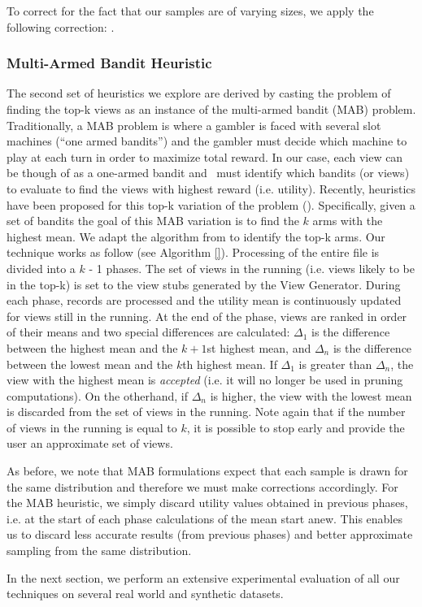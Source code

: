 To correct for the fact that our samples are of varying sizes, we apply the
following correction: .

\subsubsection{Multi-Armed Bandit Heuristic}
\label{subsubsec:multi_armed_bandit}
The second set of heuristics we explore are derived by casting the problem of
finding the top-k views as an instance of the multi-armed bandit (MAB) problem. 
Traditionally, a MAB problem is where a gambler is faced with several slot
machines (``one armed bandits'') and the gambler must decide which machine to
play at each turn in order to maximize total reward. 
In our case, each view can be though of as a one-armed bandit and \SeeDB\ must
identify which bandits (or views) to evaluate to find the views with highest
reward (i.e. utility).
Recently, heuristics have been proposed for this top-k variation of the problem
(\cite{}). 
Specifically, given a set of bandits the goal of this MAB variation is to find
the $k$ arms with the highest mean.
We adapt the algorithm from \cite{} to identify the top-k arms.
Our technique works as follow (see Algorithm \ref{}).
Processing of the entire file is divided into a $k$ - 1 phases. 
The set of views in the running (i.e. views likely to be in the top-k) is set to
the view stubs generated by the View Generator.
During each phase, records are
processed and the utility mean is continuously updated for views still in
the running.
At the end of the phase, views are ranked in order of their means and
two special differences are calculated: $\Delta_1$ is the difference between the
highest mean and the $k+1$st highest mean, and $\Delta_n$ is the difference
between the lowest mean and the $k$th highest mean.
If $\Delta_1$ is greater than $\Delta_n$, the view with the highest mean is
{\it accepted} (i.e. it will no longer be used in pruning computations). On the
otherhand, if $\Delta_n$ is higher, the view with the lowest mean is discarded
from the set of views in the running.
Note again that if the number of views in the running is equal to $k$, it is
possible to stop early and provide the user an approximate set of views.

As before, we note that MAB formulations expect that each sample is drawn for
the same distribution and therefore we must make corrections accordingly. 
For the MAB heuristic, we simply discard utility values obtained in previous
phases, i.e. at the start of each phase calculations of the mean start anew.
This enables us to discard less accurate results (from previous phases) and
better approximate sampling from the same distribution.

In the next section, we perform an extensive experimental evaluation of all our
techniques on several real world and synthetic datasets.
